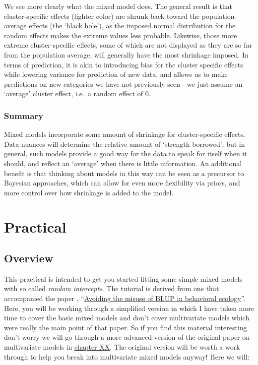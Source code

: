 \documentclass[
  12pt,
]{book}
\begin{document}
We see more clearly what the mixed model does. The general result is that cluster-specific effects (lighter color) are shrunk back toward the population-average effects (the `black hole'), as the imposed normal distribution for the random effects makes the extreme values less probable. Likewise, those more extreme cluster-specific effects, some of which are not displayed as they are so far from the population average, will generally have the most shrinkage imposed. In terms of prediction, it is akin to introducing bias for the cluster specific effects while lowering variance for prediction of new data, and allows us to make predictions on new categories we have not previously seen - we just assume an `average' cluster effect, i.e.~a random effect of 0.

\hypertarget{summary}{%
\subsubsection{Summary}\label{summary}}

Mixed models incorporate some amount of shrinkage for cluster-specific effects. Data nuances will determine the relative amount of `strength borrowed', but in general, such models provide a good way for the data to speak for itself when it should, and reflect an `average' when there is little information. An additional benefit is that thinking about models in this way can be seen as a precursor to Bayesian approaches, which can allow for even more flexibility via priors, and more control over how shrinkage is added to the model.

\hypertarget{practical-2}{%
\section{Practical}\label{practical-2}}

\hypertarget{overview}{%
\subsection{Overview}\label{overview}}

This practical is intended to get you started fitting some simple mixed models with so called \emph{random intercepts}. The tutorial is derived from one that accompanied the paper \citep{houslay_avoiding_2017}, ``\href{https://doi.org/10.1093/beheco/arx023}{Avoiding the misuse of BLUP in behavioral ecology}''. Here, you will be working through a simplified version in which I have taken more time to cover the basic mixed models and don't cover multivariate models which were really the main point of that paper. So if you find this material interesting don't worry we will go through a more advanced version of the original paper on multivariate models in \protect\hyperlink{to_be_written}{chapter XX}. The original version will be worth a work through to help you break into multivariate mixed models anyway! Here we will:
\end{document}
